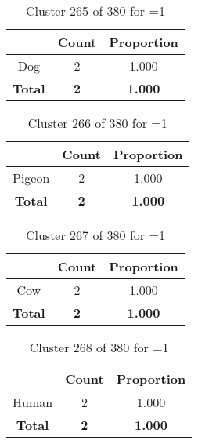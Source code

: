 \begin{table}[ht!]
\centering
\begin{tabular}{|c|c|c|}
\hline
\bf \Spec{} &\bf Count &\bf Proportion\\ \hline \hline
Dog & 2 & 1.000\\ \hline
\hline
\bf Total & \bf 2 & \bf 1.000\\ \hline
\end{tabular}
\label{tab:cluster:265:1}
\caption{Cluster 265 of 380 for \minneigh{}=1}
\end{table}

\begin{table}[ht!]
\centering
\begin{tabular}{|c|c|c|}
\hline
\bf \Spec{} &\bf Count &\bf Proportion\\ \hline \hline
Pigeon & 2 & 1.000\\ \hline
\hline
\bf Total & \bf 2 & \bf 1.000\\ \hline
\end{tabular}
\label{tab:cluster:266:1}
\caption{Cluster 266 of 380 for \minneigh{}=1}
\end{table}

\begin{table}[ht!]
\centering
\begin{tabular}{|c|c|c|}
\hline
\bf \Spec{} &\bf Count &\bf Proportion\\ \hline \hline
Cow & 2 & 1.000\\ \hline
\hline
\bf Total & \bf 2 & \bf 1.000\\ \hline
\end{tabular}
\label{tab:cluster:267:1}
\caption{Cluster 267 of 380 for \minneigh{}=1}
\end{table}

\begin{table}[ht!]
\centering
\begin{tabular}{|c|c|c|}
\hline
\bf \Spec{} &\bf Count &\bf Proportion\\ \hline \hline
Human & 2 & 1.000\\ \hline
\hline
\bf Total & \bf 2 & \bf 1.000\\ \hline
\end{tabular}
\label{tab:cluster:268:1}
\caption{Cluster 268 of 380 for \minneigh{}=1}
\end{table}

